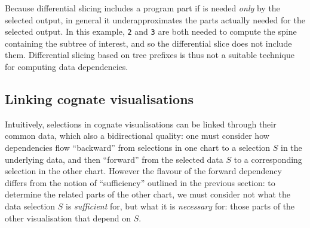 \noindent Because differential slicing includes a program part if is needed \emph{only} by the selected output, in general it underapproximates the parts actually needed for the selected output. In this example, \lstinline{2} and \lstinline{3} are both needed to compute the spine containing the subtree of interest, and so the differential slice does not include them. Differential slicing based on tree prefixes is thus not a suitable technique for computing data dependencies.

\subsection{Linking cognate visualisations}

Intuitively, selections in cognate visualisations can be linked through their common data, which also a bidirectional quality: one must consider how dependencies flow ``backward'' from selections in one chart to a selection $S$ in the underlying data, and then ``forward'' from the selected data $S$ to a corresponding selection in the other chart. However the flavour of the forward dependency differs from the notion of ``sufficiency'' outlined in the previous section: to determine the related parts of the other chart, we must consider not what the data selection $S$ is \emph{sufficient} for, but what it is \emph{necessary} for: those parts of the other visualisation that depend on $S$.



